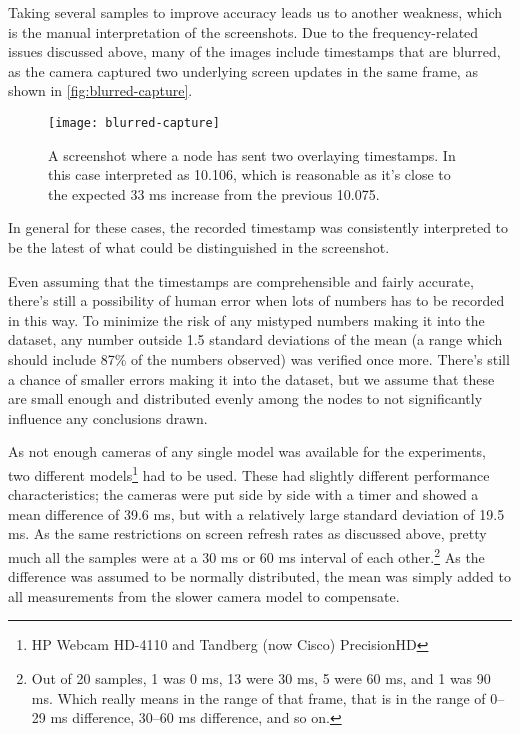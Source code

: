 Taking several samples to improve accuracy leads us to another weakness, which is the manual interpretation of the screenshots. Due to the frequency-related issues discussed above, many of the images include timestamps that are blurred, as the camera captured two underlying screen updates in the same frame, as shown in \autoref{fig:blurred-capture}.

\begin{figure}
    \centering
    \texttt{[image: blurred-capture]}
    \caption{A screenshot where a node has sent two overlaying timestamps. In this case interpreted as 10.106, which is reasonable as it's close to the expected 33 ms increase from the previous 10.075.}
    \label{fig:blurred-capture}
\end{figure}

In general for these cases, the recorded timestamp was consistently interpreted to be the latest of what could be distinguished in the screenshot.

Even assuming that the timestamps are comprehensible and fairly accurate, there's still a possibility of human error when lots of numbers has to be recorded in this way. To minimize the risk of any mistyped numbers making it into the dataset, any number outside 1.5 standard deviations of the mean (a range which should include 87\% of the numbers observed) was verified once more. There's still a chance of smaller errors making it into the dataset, but we assume that these are small enough and distributed evenly among the nodes to not significantly influence any conclusions drawn.

As not enough cameras of any single model was available for the experiments, two different models\footnote{HP Webcam HD-4110 and Tandberg (now Cisco) PrecisionHD} had to be used. These had slightly different performance characteristics; the cameras were put side by side with a timer and showed a mean difference of 39.6 ms, but with a relatively large standard deviation of 19.5 ms. As the same restrictions on screen refresh rates as discussed above, pretty much all the samples were at a 30 ms or 60 ms interval of each other.\footnote{Out of 20 samples, 1 was 0 ms, 13 were 30 ms, 5 were 60 ms, and 1 was 90 ms. Which really means in the range of that frame, that is in the range of 0--29 ms difference, 30--60 ms difference, and so on.} As the difference was assumed to be normally distributed, the mean was simply added to all measurements from the slower camera model to compensate.

